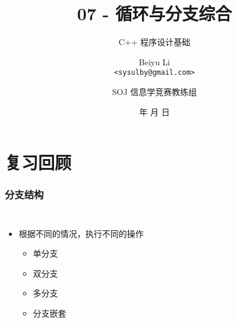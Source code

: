 \title[07 - 循环与分支综合]
{07 - 循环与分支综合}

\subtitle{C++ 程序设计基础}

\author[Beiyu Li]
{Beiyu Li\\
\texttt{<sysulby@gmail.com>}}


\date[\today]
{\number\year 年 \number\month 月 \number\day 日}




\author[sysulby]
{SOJ 信息学竞赛教练组}

\begin{frame}
    \titlepage
\end{frame}
\setcounter{framenumber}{0} %


\section{复习回顾}

\begin{frame}[fragile]
    \frametitle{分支结构}

    \begin{columns}

        \begin{itemize}[<+->]
            \item 根据不同的情况，执行不同的操作
                \begin{itemize}
                    \item 单分支
                    \item 双分支
                    \item 多分支
                    \item 分支嵌套
                \end{itemize}
        \end{itemize}




    \end{columns}

\end{frame}

